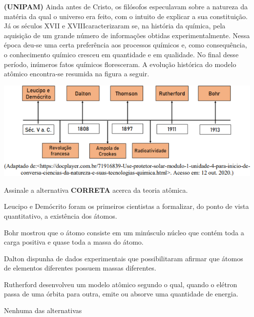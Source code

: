 \documentclass[9 pt]{scrartcl}
\def\PQ{0.84} %
\begin{document}
\begin{exercise}[points=\PQ]
\textbf{(UNIPAM)} Ainda antes de Cristo, os filósofos especulavam sobre a natureza da matéria da qual o universo era feito, com o intuito de explicar a sua constituição. Já os séculos XVII e XVIIIcaracterizaram se, na história da química, pela aquisição de um grande número de informações obtidas experimentalmente. Nessa época deu-se uma certa preferência aos processos químicos e, como consequência, o conhecimento químico cresceu em quantidade e em qualidade. No final desse período, inúmeros fatos químicos floresceram. A evolução histórica do modelo atômico encontra-se resumida na figura a seguir.

\begin{center}
\includegraphics[width=.9\linewidth]{Quimica_Geral/TeoriaAtomica/evolucao.png}
\end{center}

Assinale a alternativa \textbf{CORRETA} acerca da teoria atômica.

\begin{choice}
\choice Leucipo e Demócrito foram os primeiros cientistas a formalizar, do ponto de vista quantitativo, a existência dos átomos.

\choice  Bohr mostrou que o átomo consiste em um minúsculo núcleo que contém toda a carga positiva e quase toda a massa do átomo.

\choice Dalton dispunha de dados experimentais que possibilitaram afirmar que átomos de elementos diferentes possuem massas diferentes.

\choice Rutherford desenvolveu um modelo atômico segundo o qual, quando o elétron passa de uma órbita para outra, emite ou absorve uma quantidade de energia.

\choice Nenhuma das alternativas
\end{choice}
\end{exercise}







\end{document}
